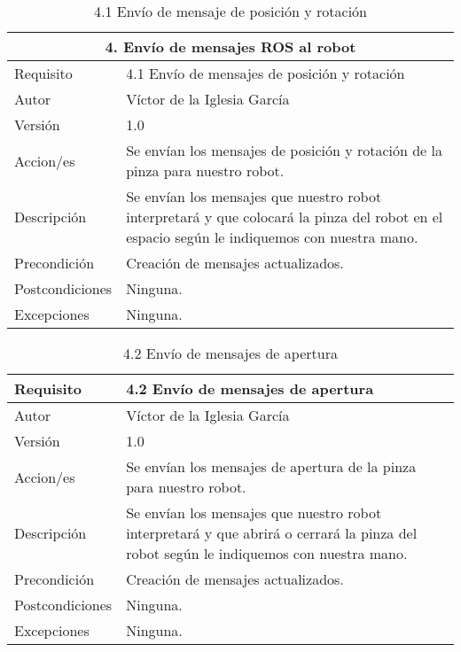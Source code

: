 \begin{table}[h]
    \centering
    \begin{tabular}{| m{3cm} | m{8cm} |}
    \hline
       \multicolumn{2}{|c|}{\textbf{4. Envío de mensajes ROS al robot}}                \\ \hline 
        Requisito & 4.1 Envío de mensajes de posición y rotación\\ \hline
       Autor  &  Víctor de la Iglesia García \\ \hline
        Versión & 1.0 \\ \hline
        Accion/es & Se envían los mensajes de posición y rotación de la pinza para nuestro robot.\\ \hline
         Descripción & Se envían los mensajes que nuestro robot interpretará y que colocará la pinza del robot en el espacio según le indiquemos con nuestra mano. \\ \hline
        Precondición & Creación de mensajes actualizados. \\ \hline
        Postcondiciones & Ninguna. \\ \hline
        Excepciones & Ninguna. \\ \hline
    \end{tabular}
    \caption{4.1 Envío de mensaje de posición y rotación}
    \label{4.1 Envío de mensaje de posición y rotación}
\end{table}

\begin{table}[h]
    \centering
    \begin{tabular}{| m{3cm} | m{8cm} |}
    \hline
        Requisito & 4.2 Envío de mensajes de apertura\\ \hline
       Autor  &  Víctor de la Iglesia García \\ \hline
        Versión & 1.0 \\ \hline
        Accion/es & Se envían los mensajes de apertura de la pinza para nuestro robot.\\ \hline
         Descripción & Se envían los mensajes que nuestro robot interpretará y que abrirá o cerrará la pinza del robot según le indiquemos con nuestra mano. \\ \hline
        Precondición & Creación de mensajes actualizados. \\ \hline
        Postcondiciones & Ninguna. \\ \hline
        Excepciones & Ninguna. \\ \hline
    \end{tabular}
    \caption{4.2 Envío de mensajes de apertura}
    \label{4.2 Envío de mensajes de apertura}
\end{table}

